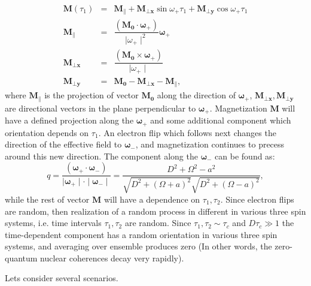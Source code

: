 \documentclass[a4paper, 12pt]{article}
\begin{document}
\begin{equation}
\begin{array}{lcl}
      \bm{M}(\tau_1)  &=&  \bm{M_{\parallel}}  + \bm{M_{\bot x} }  \sin \omega_{+} \tau_1 + \bm{M_{\bot y}} \cos \omega_{+} \tau_1\\
      \bm{M_{\parallel}} &=& \dfrac{(\bm{M_0} \cdot \bm{\omega_{+}})}{  \mid \omega_{+} \mid ^2}  \bm{\omega_{+}} \\
      \bm{M_{\bot x}} &=&  \dfrac{(\bm{M_0} \times \bm{\omega_{+}})}{  \mid \omega_{+} \mid } \\
      \bm{M_{\bot y}} &=&        \bm{M_{0}} - \bm{M_{\bot x}} - \bm{M_{\parallel}},
\end{array}
\end{equation}
where $\bm{M_{\parallel}}$ is the  projection of vector $\bm{M_{0}}$  along the direction of $\bm{\omega_{+}}$, $\bm{M_{\bot x}}, \bm{M_{\bot y}}$ are directional vectors in the plane perpendicular to $\bm{\omega_{+}}$. Magnetization $\bm{M}$ will have a defined projection along the $\bm{\omega_{+}}$ and some additional component which orientation depends on $\tau_1$. 
An electron flip which follows next changes the direction of the effective field to $\bm{\omega_{-}}$, and magnetization continues to precess around this new direction. The component along the $\bm{\omega_{-}}$ can be found as:
\begin{equation}
    q = \dfrac{(\bm{\omega_{+}} \cdot \bm{\omega_{-}}  )}{ \mid  \bm{\omega_{+}}  \mid \cdot \mid \bm{\omega_{-}}  \mid    } =  \dfrac{D^2 + \Omega^2 - a^2}{\sqrt{D^2 + (\Omega + a )^2}  \sqrt{D^2 + (\Omega - a )^2}},
\end{equation}
while the rest of vector $\bm{M}$ will have a dependence on $\tau_1, \tau_2$. Since electron flips are random, then realization of a random process in different in various three spin systems, i.e. time intervals $\tau_1, \tau_2$ are random. Since $\tau_1, \tau_2 \sim \tau_c$ and $D \tau_c \gg 1$ the time-dependent component has a random orientation in various three spin systems, and averaging over ensemble produces zero (In other words, the zero-quantum nuclear coherences decay very rapidly).

Lets consider several scenarios.
\end{document}
